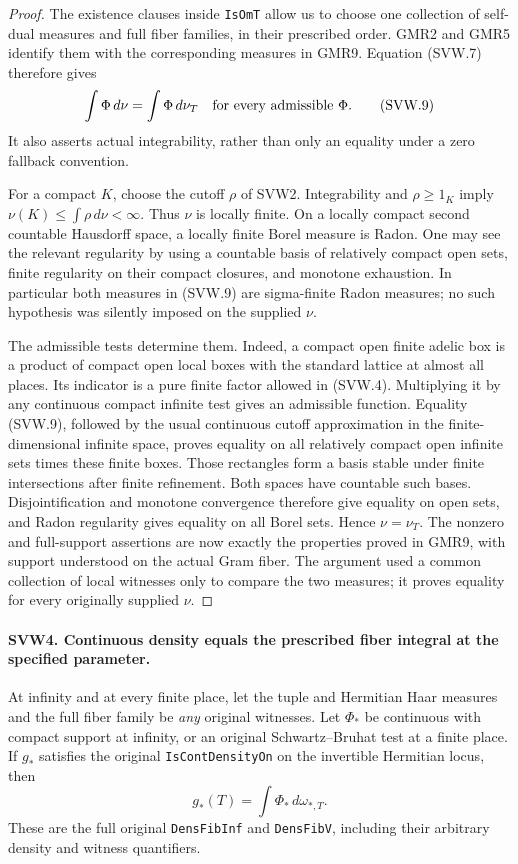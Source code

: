 \documentclass[11pt,a4paper]{article}
\numberwithin{equation}{section}
\theoremstyle{remark}\newtheorem{remark}[theorem]{Remark}
\begin{document}
\begin{proof}
The existence clauses inside \texttt{Is\allowbreak Om\allowbreak T} allow us to choose one
collection of self-dual measures and full fiber families, in their
prescribed order.  GMR2 and GMR5 identify them with the corresponding
measures in GMR9.  Equation (SVW.7) therefore gives
\[
                \int\Phi\,d\nu=\int\Phi\,d\nu_T
          \quad\hbox{for every admissible }\Phi.
 \tag{SVW.9}
\]
It also asserts actual integrability, rather than only an equality
under a zero fallback convention.

For a compact $K$, choose the cutoff $\rho$ of SVW2.  Integrability
and $\rho\geq1_K$ imply
$\nu(K)\leq\int\rho\,d\nu<\infty$.  Thus $\nu$ is locally finite.
On a locally compact second countable Hausdorff space, a locally
finite Borel measure is Radon.  One may see the relevant regularity
by using a countable basis of relatively compact open sets, finite
regularity on their compact closures, and monotone exhaustion.
In particular both measures in (SVW.9) are sigma-finite Radon
measures; no such hypothesis was silently imposed on the supplied
$\nu$.

The admissible tests determine them.  Indeed, a compact open finite
adelic box is a product of compact open local boxes with the
standard lattice at almost all places.  Its indicator is a pure
finite factor allowed in (SVW.4).  Multiplying it by any continuous
compact infinite test gives an admissible function.  Equality
(SVW.9), followed by the usual continuous cutoff approximation in
the finite-dimensional infinite space, proves equality on all
relatively compact open infinite sets times these finite boxes.
Those rectangles form a basis stable under finite intersections
after finite refinement.  Both spaces have countable such bases.
Disjointification and monotone convergence therefore give equality
on open sets, and Radon regularity gives equality on all Borel sets.
Hence $\nu=\nu_T$.  The nonzero and full-support assertions are now
exactly the properties proved in GMR9, with support understood on
the actual Gram fiber.  The argument used a common collection of
local witnesses only to compare the two measures; it proves equality
for every originally supplied $\nu$.
\end{proof}

\paragraph{SVW4. Continuous density equals the prescribed fiber integral at the specified parameter.}
\label{claim:SVW4}
At infinity and at every finite place, let the tuple and Hermitian
Haar measures and the full fiber family be \emph{any} original
witnesses.  Let $\Phi_*$ be continuous with compact support at
infinity, or an original Schwartz--Bruhat test at a finite place.
If $g_*$ satisfies the original \texttt{Is\allowbreak Cont\allowbreak Density\allowbreak On} on the
invertible Hermitian locus, then
\[
                   g_*(T)=\int\Phi_*\,d\omega_{*,T}.
 \tag{SVW.10}
\]
These are the full original \texttt{Dens\allowbreak Fib\allowbreak Inf} and
\texttt{Dens\allowbreak Fib\allowbreak V}, including their arbitrary density and witness
quantifiers.
\end{document}
